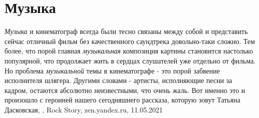  
 
 
 
 
\chapter{Музыка}
\label{sec:slova.muzyka}

\emph{Музыка} и кинематограф всегда были тесно связаны между собой и представить
сейчас отличный фильм без качественного саундтрека довольно-таки сложно. Тем
более, что порой главная \emph{музыкальная} композиция картины становится настолько
популярной, что продолжает жить в сердцах слушателей уже отдельно от фильма.
Но проблема \emph{музыкальной} темы в кинематографе - это порой забвение исполнителя
шлягера. Другими словами - артисты, исполняющие песни за кадром, остаются
абсолютно неизвестными, что очень жаль. Вот именно это и произошло с героиней
нашего сегодняшнего рассказа, которую зовут Татьяна Дасковская,
, Rock Story,
zen.yandex.ru, 11.05.2021

